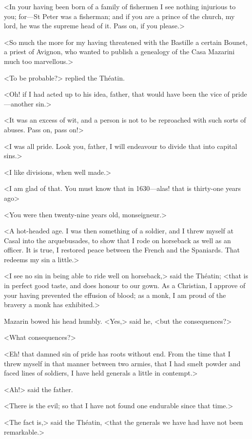 <In your having been born of a family of fishermen I see nothing injurious to you; for—St Peter was a fisherman; and if you are a prince of the church, my lord, he was the supreme head of it. Pass on, if you please.>

<So much the more for my having threatened with the Bastille a certain Bounet, a priest of Avignon, who wanted to publish a genealogy of the Casa Mazarini much too marvellous.>

<To be probable?> replied the Théatin.

<Oh! if I had acted up to his idea, father, that would have been the vice of pride—another sin.>

<It was an excess of wit, and a person is not to be reproached with such sorts of abuses. Pass on, pass on!>

<I was all pride. Look you, father, I will endeavour to divide that into capital sins.>

<I like divisions, when well made.>

<I am glad of that. You must know that in 1630—alas! that is thirty-one years ago\longdash>

<You were then twenty-nine years old, monseigneur.>

<A hot-headed age. I was then something of a soldier, and I threw myself at Casal into the arquebusades, to show that I rode on horseback as well as an officer. It is true, I restored peace between the French and the Spaniards. That redeems my sin a little.>

<I see no sin in being able to ride well on horseback,> said the Théatin; <that is in perfect good taste, and does honour to our gown. As a Christian, I approve of your having prevented the effusion of blood; as a monk, I am proud of the bravery a monk has exhibited.>

Mazarin bowed his head humbly. <Yes,> said he, <but the consequences?>

<What consequences?>

<Eh! that damned sin of pride has roots without end. From the time that I threw myself in that manner between two armies, that I had smelt powder and faced lines of soldiers, I have held generals a little in contempt.>

<Ah!> said the father.

<There is the evil; so that I have not found one endurable since that time.>

<The fact is,> said the Théatin, <that the generals we have had have not been remarkable.>

